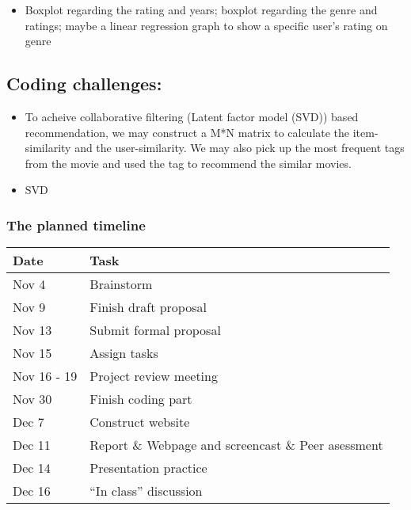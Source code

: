 \documentclass[
]{article}
\providecommand{\tightlist}{%
  \setlength{\itemsep}{0pt}\setlength{\parskip}{0pt}}
\begin{document}
\begin{itemize}
\tightlist
\item
  Boxplot regarding the rating and years; boxplot regarding the genre
  and ratings; maybe a linear regression graph to show a specific user's
  rating on genre
\end{itemize}

\hypertarget{coding-challenges}{%
\subsection{Coding challenges:}\label{coding-challenges}}

\begin{itemize}
\item
  To acheive collaborative filtering (Latent factor model (SVD)) based
  recommendation, we may construct a M*N matrix to calculate the
  item-similarity and the user-similarity. We may also pick up the most
  frequent tags from the movie and used the tag to recommend the similar
  movies.
\item
  SVD
\end{itemize}

\hypertarget{the-planned-timeline}{%
\subsubsection{The planned timeline}\label{the-planned-timeline}}

\begin{longtable}[]{@{}ll@{}}
\toprule
Date & Task \\
\midrule
\endhead
Nov 4 & Brainstorm \\
Nov 9 & Finish draft proposal \\
Nov 13 & Submit formal proposal \\
Nov 15 & Assign tasks \\
Nov 16 - 19 & Project review meeting \\
Nov 30 & Finish coding part \\
Dec 7 & Construct website \\
Dec 11 & Report \& Webpage and screencast \& Peer asessment \\
Dec 14 & Presentation practice \\
Dec 16 & ``In class'' discussion \\
\bottomrule
\end{longtable}
\end{document}
